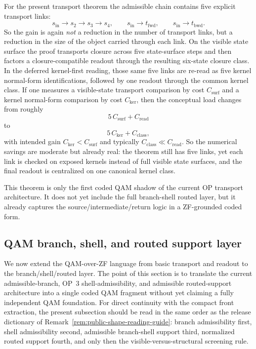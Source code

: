 \begin{remark}\label{rem:qam-kernel-first-transport-savings}
For the present transport theorem the admissible chain contains five explicit transport links:
\[
s_{\mathrm{in}}\to s_2\to s_3\to s_4,
\qquad
s_{\mathrm{in}}\to t_{\mathrm{fwd}},
\qquad
s_{\mathrm{in}}\to t_{\mathrm{bwd}}.
\]
So the gain is again \emph{not} a reduction in the number of transport links, but a reduction in the size of the object carried through each link. On the visible state surface the proof transports closure across five state-surface steps and then factors a closure-compatible readout through the resulting six-state closure class. In the deferred kernel-first reading, those same five links are re-read as five kernel normal-form identifications, followed by one readout through the common kernel class. If one measures a visible-state transport comparison by cost $C_{\mathrm{surf}}$ and a kernel normal-form comparison by cost $C_{\mathrm{ker}}$, then the conceptual load changes from roughly
\[
5\,C_{\mathrm{surf}} + C_{\mathrm{read}}
\]
to
\[
5\,C_{\mathrm{ker}} + C_{\mathrm{class}},
\]
with intended gain $C_{\mathrm{ker}}<C_{\mathrm{surf}}$ and typically $C_{\mathrm{class}}\ll C_{\mathrm{read}}$. So the numerical savings are moderate but already real: the theorem still has five links, yet each link is checked on exposed kernels instead of full visible state surfaces, and the final readout is centralized on one canonical kernel class.
\end{remark}

\begin{remark}
This theorem is only the first coded QAM shadow of the current OP transport architecture. It does not yet include the full branch-shell routed layer, but it already captures the source/intermediate/return logic in a ZF-grounded coded form.
\end{remark}



\subsection*{QAM branch, shell, and routed support layer}

We now extend the QAM-over-ZF language from basic transport and readout to the branch/shell/routed layer. The point of this section is to translate the current admissible-branch, OP~3 shell-admissibility, and admissible routed-support architecture into a single coded QAM fragment without yet claiming a fully independent QAM foundation. For direct continuity with the compact front extraction, the present subsection should be read in the same order as the release dictionary of Remark~\ref{rem:public-shape-reading-guide}: branch admissibility first, shell admissibility second, admissible branch-shell support third, normalized routed support fourth, and only then the visible-versus-structural screening rule.

